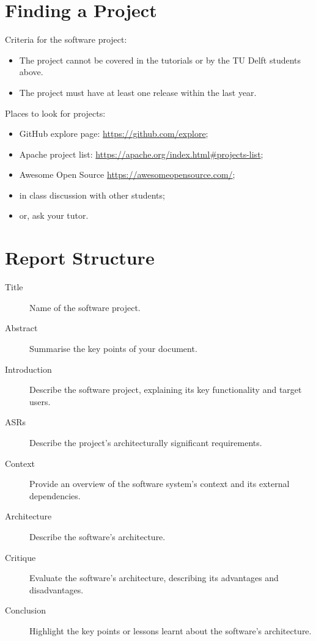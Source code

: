 \documentclass{csse4400}
\begin{document}
\section{Finding a Project}
Criteria for the software project:
\begin{itemize}
    \item The project cannot be covered in the tutorials or by the TU Delft students above.
    \item The project must have at least one release within the last year.
\end{itemize}

\noindent%
 Places to look for projects:
\begin{itemize}
    \item GitHub explore page: \url{https://github.com/explore};
    \item Apache project list: \url{https://apache.org/index.html#projects-list};
    \item Awesome Open Source \url{https://awesomeopensource.com/};
    \item in class discussion with other students;
    \item or, ask your tutor.
\end{itemize}

\section{Report Structure}

\begin{description}
    \item[Title] Name of the software project.
    \item[Abstract] Summarise the key points of your document.
    \item[Introduction] Describe the software project, explaining its key functionality and target users.
    \item[ASRs] Describe the project's architecturally significant requirements.
    \item[Context] Provide an overview of the software system's context and its external dependencies.
    \item[Architecture] Describe the software's architecture.
    \item[Critique] Evaluate the software's architecture, describing its advantages and disadvantages.
    \item[Conclusion] Highlight the key points or lessons learnt about the software's architecture.
\end{description}
\end{document}
